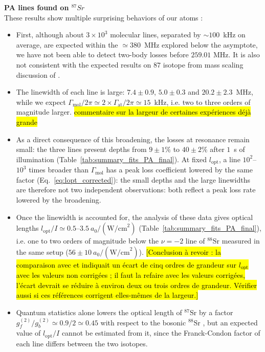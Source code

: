 \textbf{PA lines found on $^{87}Sr$}\\
These results show multiple surprising behaviors of our atoms :

\begin{itemize}
    \item First, although about $3\times10^3$ molecular lines, separated by $\sim100$~kHz on average, are expected within the $\simeq380$~MHz explored below the asymptote, we have not been able to detect two-body losses before $259.01$ 
    MHz. It is also not consistent with the expected results on $87$ isotope from mass scaling discussion of \cite{borkowski_mass_2014}.
    \item The linewidth of each line is large: $7.4 \pm 0.9$, $5.0 \pm 0.3$ and $20.2 \pm 2.3$~MHz, while we expect $\Gamma_{\text{mol}}/2\pi \simeq 2\times \Gamma_{\text{at}}/2\pi \simeq 15$~kHz, i.e. two to three orders of magnitude larger. \hl{commentaire sur la largeur de certaines expériences déjà grande}
    \item As a direct consequence of this broadening, the losses at resonance remain small: the three lines present depths from $9\pm1\%$ to $40\pm2\%$ after $1$~s of illumination (Table~\ref{tab:summary_fits_PA_final}). At fixed $l_{\text{opt}}$, a line $10^2$--$10^3$ times broader than $\Gamma_{\text{mol}}$ has a peak loss coefficient lowered by the same factor (Eq.~\ref{eq:lopt_corrected}): the small depths and the large linewidths are therefore not two independent observations: both reflect a peak loss rate lowered by the broadening.
    \item Once the linewidth is accounted for, the analysis of these data gives optical lengths $l_{\text{opt}}/I \simeq 0.5$--$3.5~a_0/(\text{W/cm}^2)$ (Table~\ref{tab:summary_fits_PA_final}), i.e. one to two orders of magnitude below the $\nu=-2$ line of $^{88}\text{Sr}$ measured in the same setup ($56\pm10~a_0/(\text{W/cm}^2)$). \hl{[Conclusion à revoir : la comparaison avec \mbox{\cite{reschovsky_narrow-line_2018}} et \mbox{\cite{reichenbach_optical_nodate}} indiquait un écart de cinq ordres de grandeur sur $l_{\text{opt}}$ avec les valeurs non corrigées ; il faut la refaire avec les valeurs corrigées, l'écart devrait se réduire à environ deux ou trois ordres de grandeur. Vérifier aussi si ces références corrigent elles-mêmes de la largeur.]}
    \item Quantum statistics alone lowers the optical length of $^{87}\text{Sr}$ by a factor
    $g^{(2)}_f/g^{(2)}_b\simeq0.9/2\simeq0.45$ with respect to the bosonic $^{88}\text{Sr}$
    \cite{hill_photoassociative_2021}, but an expected value of $l_{\text{opt}}/I$ cannot be
    estimated from it, since the Franck-Condon factor of each line differs between the two isotopes.
\end{itemize}


